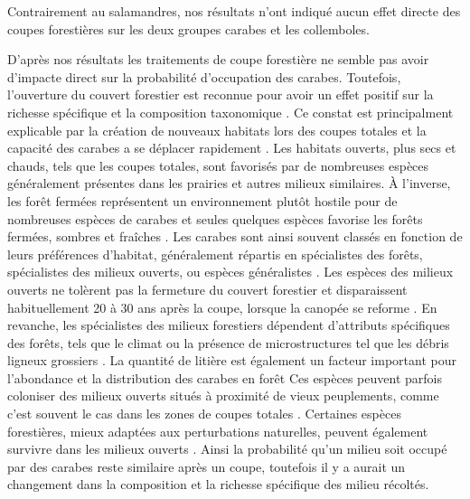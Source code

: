 
Contrairement au salamandres, nos résultats n'ont indiqué aucun effet directe des coupes forestières sur les deux groupes carabes et les collemboles. 

D'après nos résultats les traitements de coupe forestière ne semble pas avoir d'impacte direct sur la probabilité d'occupation des carabes.
Toutefois, l'ouverture du couvert forestier est reconnue pour avoir un effet positif sur la richesse spécifique et la composition taxonomique \citep{Halme1993Carabidbeetles,Heliola2001Distributioncarabid,Koivula2002Alternativeharvesting}.
Ce constat est principalment explicable par la création de nouveaux habitats lors des coupes totales et la capacité des carabes a se déplacer rapidement \citep{Niemela2007effectsforestry}. 
Les habitats ouverts, plus secs et chauds, tels que les coupes totales, sont favorisés par de nombreuses espèces généralement présentes dans les prairies et autres milieux similaires. 
À l'inverse, les forêt fermées représentent un environnement plutôt hostile pour de nombreuses espèces de carabes et seules quelques espèces favorise les forêts fermées, sombres et fraîches \citep{Niemela1993Effectsclearcut,Koivula2002Borealcarabidbeetle}.
Les carabes sont ainsi souvent classés en fonction de leurs préférences d'habitat, généralement répartis en spécialistes des forêts, spécialistes des milieux ouverts, ou espèces généralistes \citep{Niemela2007effectsforestry}. 
Les espèces des milieux ouverts ne tolèrent pas la fermeture du couvert forestier et disparaissent habituellement 20 à 30 ans après la coupe, lorsque la canopée se reforme \citep{Niemela1996importancesmallscale,Koivula2002Alternativeharvesting}.  
En revanche, les spécialistes des milieux forestiers dépendent d'attributs spécifiques des forêts, tels que le climat ou la présence de microstructures tel que les débris ligneux grossiers \citep{Niemela1996importancesmallscale,Heliola2001Distributioncarabid,Koivula2002Alternativeharvesting,Work2004Standcomposition}. 
La quantité de litière est également un facteur important pour l'abondance et la distribution des carabes en forêt \citep{Koivula.1999Leaflitter,Heliola2001Distributioncarabid,Magura2005ImpactsLeaflitter}
Ces espèces peuvent parfois coloniser des milieux ouverts situés à proximité de vieux peuplements, comme c’est souvent le cas dans les zones de coupes totales \citep{Spence1996Northernforestry,Koivula2002Alternativeharvesting}. 
Certaines espèces forestières, mieux adaptées aux perturbations naturelles, peuvent également survivre dans les milieux ouverts \citep{Niemela2007effectsforestry}. 
Ainsi la probabilité qu'un milieu soit occupé par des carabes reste similaire après un coupe, toutefois il y a aurait un changement dans la composition et la richesse spécifique des milieu récoltés. 


